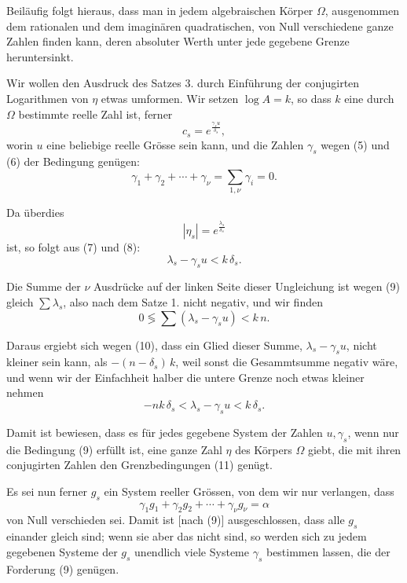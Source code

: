 \documentclass[12pt,a4paper]{article}
\begin{document}
Beiläufig folgt hieraus, dass man in jedem algebraischen Körper $\Omega$, ausgenommen dem rationalen und dem imaginären quadratischen, von Null verschiedene ganze Zahlen finden kann, deren absoluter Werth unter jede gegebene Grenze heruntersinkt.

Wir wollen den Ausdruck des Satzes 3. durch Einführung der conjugirten Logarithmen von $\eta$ etwas umformen. Wir setzen $\log A = k$, so dass $k$ eine durch $\Omega$ bestimmte reelle Zahl ist, ferner
\begin{equation}\label{eq:185-8}
c_s = e^{\frac{\gamma_s u}{\delta_s}},
\end{equation}
worin $u$ eine beliebige reelle Grösse sein kann, und die Zahlen $\gamma_s$ wegen (5) und (6) der Bedingung genügen:
\begin{equation}\label{eq:185-9}
\gamma_1 + \gamma_2 + \cdots + \gamma_\nu = \sum_{1,\nu} \gamma_i = 0.
\end{equation}

Da überdies
\[
|\eta_s| = e^{\frac{\lambda_s}{\delta_s}}
\]
ist, so folgt aus (7) und (8):
\begin{equation}\label{eq:185-10}
\lambda_s - \gamma_s u < k\,\delta_s.
\end{equation}

Die Summe der $\nu$ Ausdrücke auf der linken Seite dieser Ungleichung ist wegen (9) gleich $\sum\lambda_s$, also nach dem Satze 1. nicht negativ, und wir finden
\[
0 \lessgtr \sum(\lambda_s - \gamma_s u) < k\,n.
\]

Daraus ergiebt sich wegen (10), dass ein Glied dieser Summe, $\lambda_s - \gamma_s u$, nicht kleiner sein kann, als $-(n - \delta_s)\,k$, weil sonst die Gesammtsumme negativ wäre, und wenn wir der Einfachheit halber die untere Grenze noch etwas kleiner nehmen
\begin{equation}\label{eq:185-11}
-nk\,\delta_s < \lambda_s - \gamma_s u < k\,\delta_s.
\end{equation}

Damit ist bewiesen, dass es für jedes gegebene System der Zahlen $u, \gamma_s$, wenn nur die Bedingung (9) erfüllt ist, eine ganze Zahl $\eta$ des Körpers $\Omega$ giebt, die mit ihren conjugirten Zahlen den Grenzbedingungen (11) genügt.

Es sei nun ferner $g_s$ ein System reeller Grössen, von dem wir nur verlangen, dass
\[
\gamma_1 g_1 + \gamma_2 g_2 + \cdots + \gamma_\nu g_\nu = \alpha
\]
von Null verschieden sei. Damit ist [nach (9)] ausgeschlossen, dass alle $g_s$ einander gleich sind; wenn sie aber das nicht sind, so werden sich zu jedem gegebenen Systeme der $g_s$ unendlich viele Systeme $\gamma_s$ bestimmen lassen, die der Forderung (9) genügen.
\end{document}
